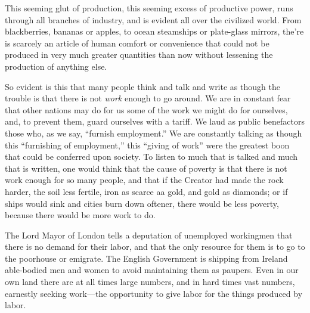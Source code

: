 \documentclass{book}
\begin{document}
This seeming glut of production, this seeming excess of productive power, runs through all branches of industry, and is evident all over the civilized world. From blackberries, bananas or apples, to ocean steamships or plate-glass mirrors, the’re is scarcely an article of human comfort or convenience that could not be produced in very much greater quantities than now without lessening the production of anything else.

So evident is this that many people think and talk and write as though the trouble is that there is not \emph{work} enough to go around. We are in constant fear that other nations may do for us some of the work we might do for ourselves, and, to prevent them, guard ourselves with a tariff. We laud as public benefactors those who, as we say, “furnish employment.” We are constantly talking as though this “furnishing of employment,” this “giving of work” were the greatest boon that could be conferred upon society. To listen to much that is talked and much that is written, one would think that the cause of poverty is that there is not work enough for so many people, and that if the Creator had made the rock harder, the soil less fertile, iron as scarce aa gold, and gold as diamonds; or if ships would sink and cities burn down oftener, there would be less poverty, because there would be more work to do.

The Lord Mayor of London tells a deputation of unemployed workingmen that there is no demand for their labor, and that the only resource for them is to go to the poorhouse or emigrate. The English Government is shipping from Ireland able-bodied men and women to avoid maintaining them as paupers. Even in our own land there are at all times large numbers, and in hard times vast numbers, earnestly seeking work—the opportunity to give labor for the things produced by labor.
\end{document}
